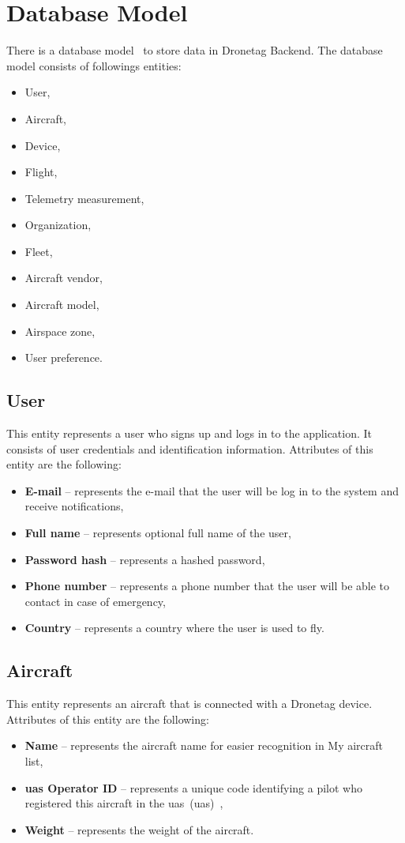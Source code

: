 \section{Database Model}\label{sec:database-model}
There is a database model~\cite{dataModel} to store data in Dronetag Backend.
The database model consists of followings entities:
\begin{itemize}
    \item User,
    \item Aircraft,
    \item Device,
    \item Flight,
    \item Telemetry measurement,
    \item Organization,
    \item Fleet,
    \item Aircraft vendor,
    \item Aircraft model,
    \item Airspace zone,
    \item User preference.
\end{itemize}

\subsection{User}\label{subsec:user}
This entity represents a user who signs up and logs in to the application.
It consists of user credentials and identification information.
Attributes of this entity are the following:
\begin{itemize}
    \item \textbf{E-mail} -- represents the e-mail that the user will be log in to the system and receive notifications,
    \item \textbf{Full name} -- represents optional full name of the user,
    \item \textbf{Password hash} -- represents a hashed password,
    \item \textbf{Phone number} -- represents a phone number that the user will be able to contact in case of emergency,
    \item \textbf{Country} -- represents a country where the user is used to fly.
\end{itemize}

\subsection{Aircraft}\label{subsec:aircraft}
This entity represents an aircraft that is connected with a Dronetag device.
Attributes of this entity are the following:
\begin{itemize}
    \item \textbf{Name} -- represents the aircraft name for easier recognition in My aircraft list,
    \item \textbf{\acrshort{uas} Operator ID} -- represents a unique code identifying a pilot who registered this aircraft in the \acrshort{uas}~(\acrlong{uas})~\cite{uas},
    \item \textbf{Weight} -- represents the weight of the aircraft.
\end{itemize}

